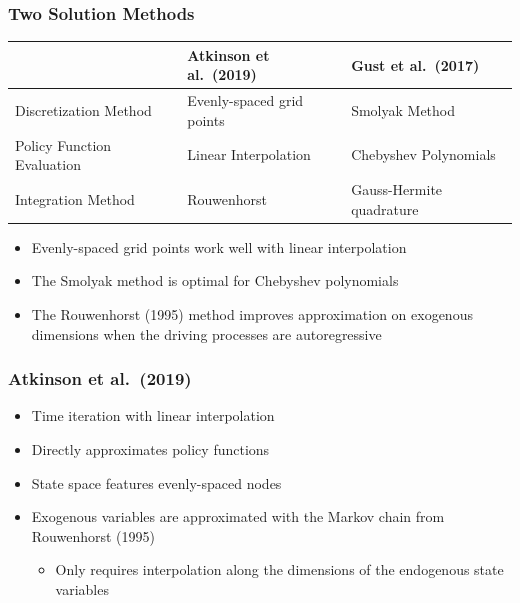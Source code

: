 \documentclass[11pt]{beamer}
\begin{document}
\begin{frame}\frametitle{Two Solution Methods}
\begin{table}\scriptsize
    \renewcommand*{\arraystretch}{1.4}
    \setlength{\tabcolsep}{6pt}      
  \begin{tabularx}{\textwidth}{l | X | X}
    \hline
    & \textbf{Atkinson et al.\ (2019)} & \textbf{Gust et al.\ (2017)} \\ \hline
    	Discretization Method & Evenly-spaced grid points & Smolyak Method\\
	Policy Function Evaluation & Linear Interpolation & Chebyshev Polynomials \\
	Integration Method & Rouwenhorst & Gauss-Hermite quadrature  \\ \hline
\end{tabularx}
\end{table}\normalsize
\begin{itemize}\setlength{\itemsep}{10pt}
\item  Evenly-spaced grid points work well with linear interpolation
\item  The Smolyak method is optimal for Chebyshev polynomials
\item  The Rouwenhorst (1995) method improves approximation on exogenous dimensions when the driving processes are autoregressive
\end{itemize}

\end{frame}
\begin{frame}\frametitle{Atkinson et al.\ (2019)}
\begin{itemize}\setlength{\itemsep}{10pt}
\item  Time iteration with linear interpolation
\item Directly approximates policy functions
\item  State space features evenly-spaced nodes
\item  Exogenous variables are approximated with the Markov chain from Rouwenhorst (1995)
  \begin{itemize}\setlength{\itemsep}{4pt}
\item Only requires interpolation along the dimensions of the endogenous state variables
\end{itemize}
\end{itemize}
\end{frame}
\end{document}
